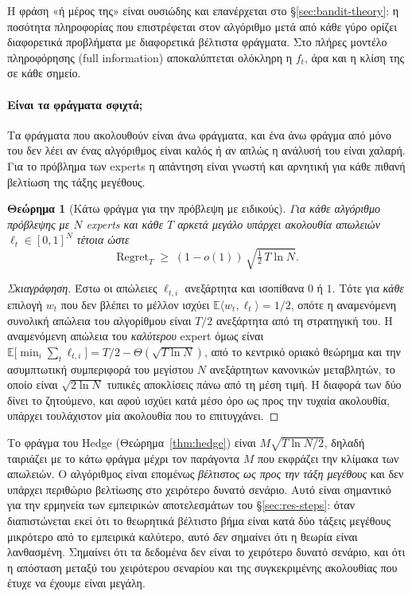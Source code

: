 \documentclass[12pt,a4paper,oneside]{report}
\newcommand{\en}[1]{\textenglish{#1}}
\renewcommand{\_}{\oldunderscore\allowbreak}
\theoremstyle{definition}
\theoremstyle{plain}
\newtheorem{theorem}{Θεώρημα}[chapter]
\theoremstyle{remark}
\begin{document}
Η φράση «ή μέρος της» είναι ουσιώδης και επανέρχεται στο \S\ref{sec:bandit-theory}: η
ποσότητα πληροφορίας που επιστρέφεται στον αλγόριθμο μετά από κάθε γύρο ορίζει διαφορετικά
προβλήματα με διαφορετικά βέλτιστα φράγματα. Στο πλήρες μοντέλο πληροφόρησης
(\en{full information}) αποκαλύπτεται ολόκληρη η $f_t$, άρα και η κλίση της σε κάθε σημείο.

\paragraph{Είναι τα φράγματα σφιχτά;} Τα φράγματα που ακολουθούν είναι άνω φράγματα, και
ένα άνω φράγμα από μόνο του δεν λέει αν ένας αλγόριθμος είναι καλός ή αν απλώς η ανάλυσή
του είναι χαλαρή. Για το πρόβλημα των experts η απάντηση είναι γνωστή και αρνητική για κάθε
πιθανή βελτίωση της τάξης μεγέθους.

\begin{theorem}[Κάτω φράγμα για την πρόβλεψη με ειδικούς]
\label{thm:lower-bound}
Για κάθε αλγόριθμο πρόβλεψης με $N$ experts και κάθε $T$ αρκετά μεγάλο υπάρχει ακολουθία
απωλειών $\ell_t \in [0,1]^N$ τέτοια ώστε
\[
\mathrm{Regret}_T \;\geq\; (1-o(1))\,\sqrt{\tfrac{1}{2}\,T \ln N}.
\]
\end{theorem}

\begin{proof}[Σκιαγράφηση]
Έστω οι απώλειες $\ell_{t,i}$ ανεξάρτητα και ισοπίθανα $0$ ή $1$. Τότε για \emph{κάθε}
επιλογή $w_t$ που δεν βλέπει το μέλλον ισχύει
$\mathbb{E}\langle w_t,\ell_t\rangle = 1/2$, οπότε η αναμενόμενη συνολική απώλεια του
αλγορίθμου είναι $T/2$ ανεξάρτητα από τη στρατηγική του. Η αναμενόμενη απώλεια του
\emph{καλύτερου} expert όμως είναι
$\mathbb{E}\big[\min_i \sum_t \ell_{t,i}\big] = T/2 - \Theta(\sqrt{T\ln N})$, από το κεντρικό
οριακό θεώρημα και την ασυμπτωτική συμπεριφορά του μεγίστου $N$ ανεξάρτητων κανονικών
μεταβλητών, το οποίο είναι $\sqrt{2\ln N}$ τυπικές αποκλίσεις πάνω από τη μέση τιμή. Η
διαφορά των δύο δίνει το ζητούμενο, και αφού ισχύει κατά μέσο όρο ως προς την τυχαία
ακολουθία, υπάρχει τουλάχιστον μία ακολουθία που το επιτυγχάνει.
\end{proof}

Το φράγμα του Hedge (Θεώρημα~\ref{thm:hedge}) είναι $M\sqrt{T\ln N/2}$, δηλαδή ταιριάζει με
το κάτω φράγμα μέχρι τον παράγοντα $M$ που εκφράζει την κλίμακα των απωλειών. Ο αλγόριθμος
είναι επομένως \emph{βέλτιστος ως προς την τάξη μεγέθους} και δεν υπάρχει περιθώριο
βελτίωσης στο χειρότερο δυνατό σενάριο. Αυτό είναι σημαντικό για την ερμηνεία των εμπειρικών
αποτελεσμάτων του \S\ref{sec:res-steps}: όταν διαπιστώνεται εκεί ότι το θεωρητικά βέλτιστο
βήμα είναι κατά δύο τάξεις μεγέθους μικρότερο από το εμπειρικά καλύτερο, αυτό \emph{δεν}
σημαίνει ότι η θεωρία είναι λανθασμένη. Σημαίνει ότι τα δεδομένα δεν είναι το χειρότερο
δυνατό σενάριο, και ότι η απόσταση μεταξύ του χειρότερου σεναρίου και της συγκεκριμένης
ακολουθίας που έτυχε να έχουμε είναι μεγάλη.
\end{document}
